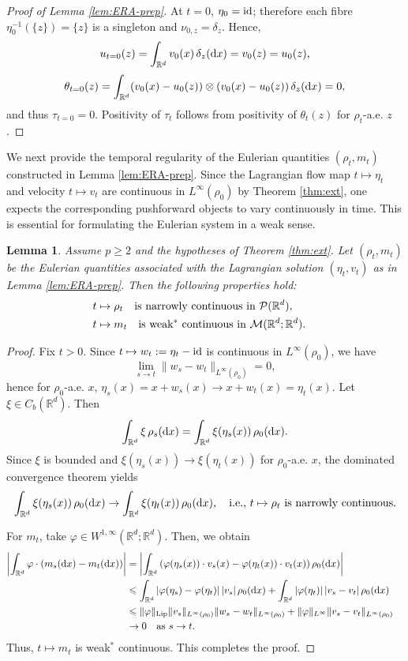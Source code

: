 \documentclass[10pt,reqno]{amsart}
\renewcommand{\geq}{\geqslant}
\renewcommand{\leq}{\leqslant}
\numberwithin{equation}{section}
\newtheorem{lemma}{Lemma}[section]
\newcommand{\R}{\mathbb R}
\newcommand{\lt}{\left}
\newcommand{\rt}{\right}
\newcommand{\intr}{\int_{\R^d}}
\newcommand{\calM}{\mathcal M}
\newcommand{\calP}{\mathcal P}
\newcommand{\dx}{\textnormal{d}x}
\begin{document}
\begin{proof}[Proof of Lemma \ref{lem:ERA-prep}]
\medskip
{}
At $t=0$, $\eta_0={\rm id}$; therefore each fibre $\eta_0^{-1}(\{z\})=\{z\}$ is a singleton and $\nu_{0,z}=\delta_z$. Hence,
\[
u_{t=0}(z)=\intr v_0(x)\,\delta_z(\dx)=v_0(z)=u_0(z),
\]
\[
\theta_{t=0}(z)=\intr (v_0(x)-u_0(z))\otimes(v_0(x)-u_0(z)) \,\delta_z(\dx)=0,
\]
and thus $\tau_{t=0}=0$. Positivity of $\tau_t$ follows from positivity of $\theta_t(z)$ for $\rho_t$-a.e. $z$.
\end{proof}

 We next provide the temporal regularity of the Eulerian quantities $(\rho_t,m_t)$  constructed in Lemma \ref{lem:ERA-prep}. Since the Lagrangian flow map $t\mapsto\eta_t$ and velocity $t\mapsto v_t$ are continuous in $L^\infty(\rho_0)$ by Theorem \ref{thm:ext}, one expects the corresponding pushforward objects to vary continuously in time. This is essential for formulating the Eulerian system in a weak sense.

\begin{lemma} \label{lem:cont}
Assume $p\geq 2$ and the hypotheses of Theorem \ref{thm:ext}.  Let $(\rho_t,m_t)$ be the Eulerian quantities associated with the Lagrangian solution $(\eta_t,v_t)$ as in Lemma \ref{lem:ERA-prep}. Then the following properties hold:
\begin{align*}
t &\mapsto \rho_t \quad\text{is narrowly continuous in }\calP(\R^d), \cr
t &\mapsto m_t \quad\text{is weak$^\ast$ continuous in }\calM(\R^d;\R^d).
\end{align*}
\end{lemma}

\begin{proof}
Fix $t>0$. Since $t\mapsto w_t:= \eta_t - {\rm id}$ is continuous in $L^\infty(\rho_0)$, we have
\[
\lim_{s\to t}\|w_s-w_t\|_{L^\infty(\rho_0)}=0,
\]
hence for $\rho_0$-a.e.  $x$,
$
\eta_s(x)=x+w_s(x)\to x+w_t(x)=\eta_t(x).
$
Let $\xi \in C_b(\R^d)$. Then
\[
\intr \xi\,\rho_s(\dx) = \intr \xi(\eta_s(x))\,\rho_0(\dx).
\]
Since $\xi$ is bounded and $\xi(\eta_s(x))\to \xi(\eta_t(x))$ for $\rho_0$-a.e.  $x$, the dominated convergence theorem yields
\[
\intr \xi(\eta_s(x))\,\rho_0(\dx)\to \intr \xi(\eta_t(x))\,\rho_0(\dx), \quad \text{i.e., $t\mapsto\rho_t$ is narrowly continuous.}
\]

For $m_t$, take $\varphi\in W^{1,\infty}(\R^d;\R^d)$. Then, we obtain
\begin{align*}
\lt| \intr \varphi\cdot (m_s(\dx) - m_t(\dx))  \rt| &= \lt|\intr \lt(\varphi(\eta_s(x))\cdot v_s(x) - \varphi(\eta_t(x))\cdot v_t(x)\rt) \rho_0(\dx)  \rt| \cr
&\leq \intr |\varphi(\eta_s)-\varphi(\eta_t)|\,|v_s|\, \rho_0(\dx) + \intr |\varphi(\eta_t)|\,|v_s-v_t|\, \rho_0(\dx)\cr
&\leq \|\varphi\|_{\rm Lip}\|v_s\|_{L^\infty(\rho_0)} \|w_s-w_t\|_{L^\infty(\rho_0)} + \|\varphi\|_{L^\infty}\|v_s-v_t\|_{L^\infty(\rho_0)}\cr
&\to 0 \quad \mbox{as } s\to t.
\end{align*}
Thus, $t\mapsto m_t$ is weak$^\ast$ continuous. This completes the proof.
\end{proof}
 
\end{document}
